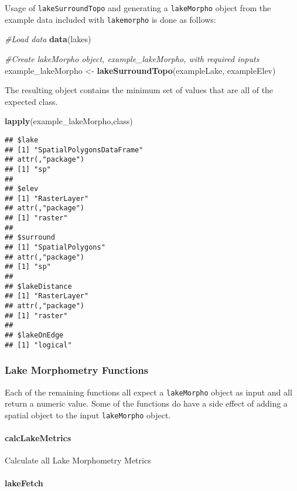 \documentclass[11pt,]{article}
\newenvironment{Shaded}{\begin{snugshade}}{\end{snugshade}}
\newcommand{\KeywordTok}[1]{\textcolor[rgb]{0.13,0.29,0.53}{\textbf{{#1}}}}
\newcommand{\StringTok}[1]{\textcolor[rgb]{0.31,0.60,0.02}{{#1}}}
\newcommand{\CommentTok}[1]{\textcolor[rgb]{0.56,0.35,0.01}{\textit{{#1}}}}
\newcommand{\NormalTok}[1]{{#1}}
\begin{document}
Usage of \texttt{lakeSurroundTopo} and generating a \texttt{lakeMorpho}
object from the example data included with \texttt{lakemorpho} is done
as follows:

\begin{Shaded}
\begin{Highlighting}[]
\CommentTok{#Load data}
\KeywordTok{data}\NormalTok{(lakes)}

\CommentTok{#Create lakeMorpho object, example_lakeMorpho, with required inputs}
\NormalTok{example_lakeMorpho <-}\StringTok{ }\KeywordTok{lakeSurroundTopo}\NormalTok{(exampleLake, exampleElev)}
\end{Highlighting}
\end{Shaded}

The resulting object contains the minimum set of values that are all of
the expected class.

\begin{Shaded}
\begin{Highlighting}[]
\KeywordTok{lapply}\NormalTok{(example_lakeMorpho,class)}
\end{Highlighting}
\end{Shaded}

\begin{verbatim}
## $lake
## [1] "SpatialPolygonsDataFrame"
## attr(,"package")
## [1] "sp"
## 
## $elev
## [1] "RasterLayer"
## attr(,"package")
## [1] "raster"
## 
## $surround
## [1] "SpatialPolygons"
## attr(,"package")
## [1] "sp"
## 
## $lakeDistance
## [1] "RasterLayer"
## attr(,"package")
## [1] "raster"
## 
## $lakeOnEdge
## [1] "logical"
\end{verbatim}

\subsubsection{Lake Morphometry
Functions}\label{lake-morphometry-functions}

Each of the remaining functions all expect a \texttt{lakeMorpho} object
as input and all return a numeric value. Some of the functions do have a
side effect of adding a spatial object to the input \texttt{lakeMorpho}
object.

\paragraph{calcLakeMetrics}\label{calclakemetrics}

Calculate all Lake Morphometry Metrics

\paragraph{lakeFetch}\label{lakefetch}
\end{document}
